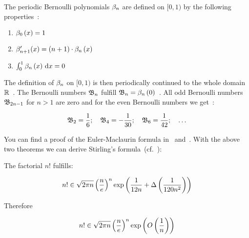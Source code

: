 The periodic Bernoulli polynomials $\bps$ are defined on $[0,1)$ by the following properties~\cite[p. 291]{koenigsberger}:

\begin{enumerate}
  \item $\bp[0]{x} = 1$
  \item $\bps[n+1]'(x) = (n+1)\cdot \bp{x}$
  \item $\int_0^1 \bp{x} \d{x} = 0$
\end{enumerate}

The definition of $\bps$ on $[0,1)$ is then periodically continued to the whole domain $\R$~\cite[pp.~225, 291]{koenigsberger}. The Bernoulli numbers $\bn$ fulfill $\bn=\bp{0}$~\cite[p.~290]{koenigsberger}. All odd Bernoulli numbers $\bn[2n-1]$ for $n>1$ are zero and for the even Bernoulli numbers we get~\cite[p.~289]{koenigsberger}:

\begin{align}
  \bn[2] = \frac 16;\quad \bn[4]=-\frac{1}{30};\quad \bn[6]=\frac{1}{42};\quad \ldots
\end{align}

You can find a proof of the Euler-Maclaurin formula in~\cite[pp.~225-226]{koenigsberger} and~\cite[pp.~506-509]{heuser}. With the above two theorems we can derive Stirling's formula~(cf.~\cite[p.~228]{koenigsberger}):

\begin{theorem}
  The factorial $n!$ fulfills:

  \begin{align}
    n! \in \sqrt{2\pi n} \left(\frac ne\right)^n \fexp{\frac 1{12n} + \bigabs{\frac{1}{120n^2}} }
  \end{align}

  \noindent Therefore

  \begin{align}
     n! \in \sqrt{2\pi n} \left(\frac ne\right)^n \fexp{\bigo{\frac 1n}}
  \end{align}
\end{theorem}

